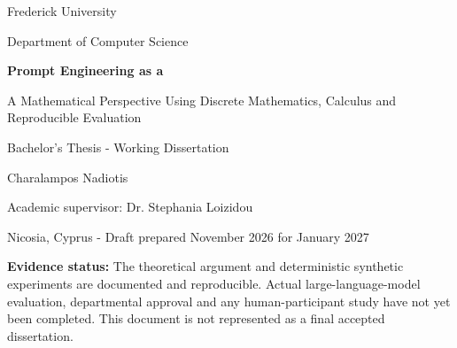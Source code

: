\documentclass[12pt,a4paper,oneside]{report}
\begin{document}
\begin{titlepage}
\centering
{\Large Frederick University\par}\vspace{7mm}
{\large Department of Computer Science\par}\vspace{30mm}
{\Huge\bfseries Prompt Engineering as a\par}
\vspace{4mm}{\Huge\bfseries Discrete-Continuous\par}
\vspace{4mm}{\Huge\bfseries Optimization Problem\par}
\vspace{12mm}
{\Large A Mathematical Perspective Using Discrete Mathematics, Calculus and Reproducible Evaluation\par}
\vspace{24mm}
{\Large Bachelor's Thesis - Working Dissertation\par}
\vspace{13mm}
{\Large Charalampos Nadiotis\par}
\vfill
{\large Academic supervisor: Dr. Stephania Loizidou\par}
\vspace{2mm}
{\large Nicosia, Cyprus - Draft prepared November 2026 for January 2027\par}
\vspace{13mm}
\begin{minipage}{0.84\linewidth}\centering\small
\textbf{Evidence status:} The theoretical argument and deterministic synthetic experiments are documented and reproducible. Actual large-language-model evaluation, departmental approval and any human-participant study have not yet been completed. This document is not represented as a final accepted dissertation.
\end{minipage}
\end{titlepage}
\end{document}
